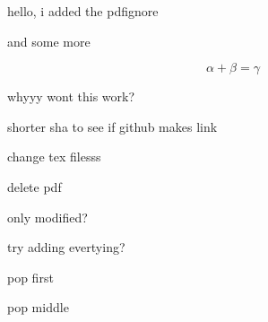 \documentclass{article}
\begin{document}
hello, i added the pdfignore

and some more

$$\alpha + \beta = \gamma$$


whyyy wont this work?

shorter sha to see if github makes link

change tex filesss

delete pdf

only modified?

try adding evertying?

pop first

pop middle
\end{document}
